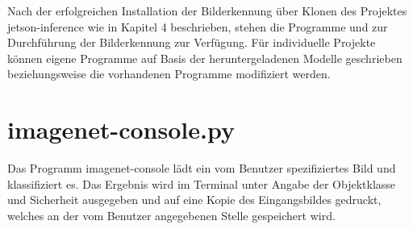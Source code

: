 %
%




Nach der erfolgreichen Installation der Bilderkennung über Klonen des Projektes jetson-inference wie in Kapitel 4 beschrieben, stehen die Programme  und  zur Durchführung der Bilderkennung zur Verfügung. Für individuelle Projekte können eigene Programme auf Basis der heruntergeladenen Modelle geschrieben beziehungsweise die vorhandenen Programme modifiziert werden.

\section{imagenet-console.py}

Das Programm imagenet-console lädt ein vom Benutzer spezifiziertes Bild und klassifiziert es.
Das Ergebnis wird im Terminal unter Angabe der Objektklasse und Sicherheit ausgegeben und auf eine Kopie des Eingangsbildes gedruckt, welches an der vom Benutzer angegebenen Stelle gespeichert wird.

